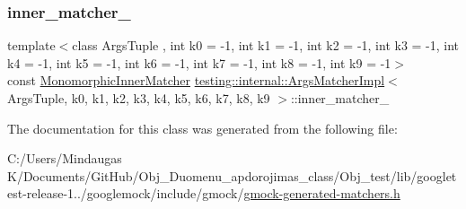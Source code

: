\subsubsection{\texorpdfstring{inner\_matcher\_}{inner\_matcher\_}}
{\footnotesize\ttfamily template$<$class Args\+Tuple , int k0 = -\/1, int k1 = -\/1, int k2 = -\/1, int k3 = -\/1, int k4 = -\/1, int k5 = -\/1, int k6 = -\/1, int k7 = -\/1, int k8 = -\/1, int k9 = -\/1$>$ \\
const \mbox{\hyperlink{classtesting_1_1internal_1_1_args_matcher_impl_ab90d2c074b2072d6c39bf26209fb941f}{Monomorphic\+Inner\+Matcher}} \mbox{\hyperlink{classtesting_1_1internal_1_1_args_matcher_impl}{testing\+::internal\+::\+Args\+Matcher\+Impl}}$<$ Args\+Tuple, k0, k1, k2, k3, k4, k5, k6, k7, k8, k9 $>$\+::inner\+\_\+matcher\+\_\+\hspace{0.3cm}{\ttfamily [private]}}



The documentation for this class was generated from the following file\+:\begin{DoxyCompactItemize}
\item 
C\+:/\+Users/\+Mindaugas K/\+Documents/\+Git\+Hub/\+Obj\+\_\+\+Duomenu\+\_\+apdorojimas\+\_\+class/\+Obj\+\_\+test/lib/googletest-\/release-\/1../googlemock/include/gmock/\mbox{\hyperlink{_obj__test_2lib_2googletest-release-1_88_81_2googlemock_2include_2gmock_2gmock-generated-matchers_8h}{gmock-\/generated-\/matchers.\+h}}\end{DoxyCompactItemize}

